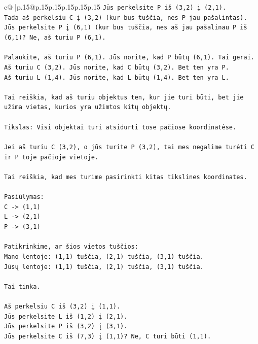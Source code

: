 \documentclass{article}
\begin{document}
{\begin{supertabular}{c@{$\;$}|p{.15\linewidth}@{}p{.15\linewidth}p{.15\linewidth}p{.15\linewidth}p{.15\linewidth}p{.15\linewidth}}
{{{\texttt{Jūs perkelsite P iš (3,2) į (2,1).} \\
\texttt{Tada aš perkelsiu C į (3,2) (kur bus tuščia, nes P jau pašalintas).} \\
\texttt{Jūs perkelsite P į (6,1) (kur bus tuščia, nes aš jau pašalinau P iš (6,1)? Ne, aš turiu P (6,1).} \\
\\ 
\texttt{Palaukite, aš turiu P (6,1). Jūs norite, kad P būtų (6,1). Tai gerai.} \\
\texttt{Aš turiu C (3,2). Jūs norite, kad C būtų (3,2). Bet ten yra P.} \\
\texttt{Aš turiu L (1,4). Jūs norite, kad L būtų (1,4). Bet ten yra L.} \\
\\ 
\texttt{Tai reiškia, kad aš turiu objektus ten, kur jie turi būti, bet jie užima vietas, kurios yra užimtos kitų objektų.} \\
\\ 
\texttt{Tikslas: Visi objektai turi atsidurti tose pačiose koordinatėse.} \\
\\ 
\texttt{Jei aš turiu C (3,2), o jūs turite P (3,2), tai mes negalime turėti C ir P toje pačioje vietoje.} \\
\\ 
\texttt{Tai reiškia, kad mes turime pasirinkti kitas tikslines koordinates.} \\
\\ 
\texttt{Pasiūlymas:} \\
\texttt{C {-}> (1,1)} \\
\texttt{L {-}> (2,1)} \\
\texttt{P {-}> (3,1)} \\
\\ 
\texttt{Patikrinkime, ar šios vietos tuščios:} \\
\texttt{Mano lentoje: (1,1) tuščia, (2,1) tuščia, (3,1) tuščia.} \\
\texttt{Jūsų lentoje: (1,1) tuščia, (2,1) tuščia, (3,1) tuščia.} \\
\\ 
\texttt{Tai tinka.} \\
\\ 
\texttt{Aš perkelsiu C iš (3,2) į (1,1).} \\
\texttt{Jūs perkelsite L iš (1,2) į (2,1).} \\
\texttt{Jūs perkelsite P iš (3,2) į (3,1).} \\
\texttt{Jūs perkelsite C iš (7,3) į (1,1)? Ne, C turi būti (1,1).} \\
}}}
\end{supertabular}}
\end{document}
